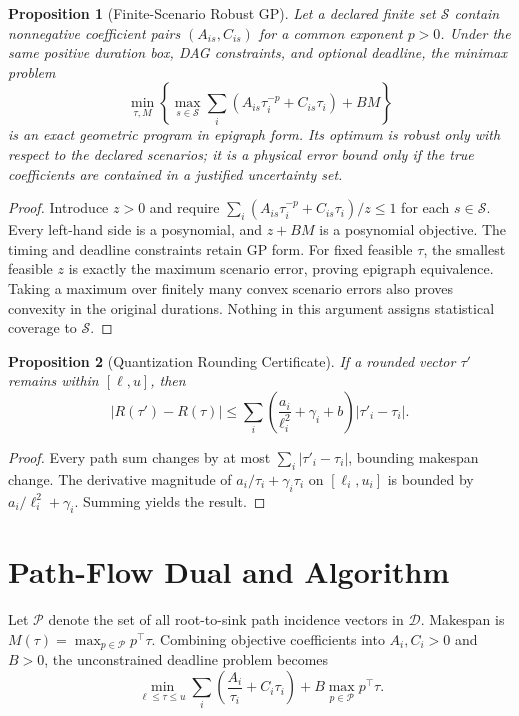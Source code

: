 \documentclass[10pt,letterpaper,journal]{IEEEtran}
\newtheorem{proposition}{Proposition}
\begin{document}
\begin{proposition}[Finite-Scenario Robust GP]\label{prop:scenario}
Let a declared finite set $\mathcal S$ contain nonnegative coefficient pairs $(A_{is},C_{is})$ for a common exponent $p>0$. Under the same positive duration box, DAG constraints, and optional deadline, the minimax problem
\begin{equation}
\min_{\tau,M}\left\{\max_{s\in\mathcal S}\sum_i(A_{is}\tau_i^{-p}+C_{is}\tau_i)+BM\right\}
\end{equation}
is an exact geometric program in epigraph form. Its optimum is robust only with respect to the \emph{declared} scenarios; it is a physical error bound only if the true coefficients are contained in a justified uncertainty set.
\end{proposition}
\begin{proof}
Introduce $z>0$ and require $\sum_i(A_{is}\tau_i^{-p}+C_{is}\tau_i)/z\le1$ for each $s\in\mathcal S$. Every left-hand side is a posynomial, and $z+BM$ is a posynomial objective. The timing and deadline constraints retain GP form. For fixed feasible $\tau$, the smallest feasible $z$ is exactly the maximum scenario error, proving epigraph equivalence. Taking a maximum over finitely many convex scenario errors also proves convexity in the original durations. Nothing in this argument assigns statistical coverage to $\mathcal S$.
\end{proof}

\begin{proposition}[Quantization Rounding Certificate]
If a rounded vector $\tau'$ remains within $[\ell, u]$, then
\begin{equation}
|R(\tau') - R(\tau)| \le \sum_i \left( \frac{a_i}{\ell_i^2} + \gamma_i + b \right) |\tau'_i - \tau_i|.
\end{equation}
\end{proposition}
\begin{proof}
Every path sum changes by at most $\sum_i |\tau'_i - \tau_i|$, bounding makespan change. The derivative magnitude of $a_i/\tau_i + \gamma_i\tau_i$ on $[\ell_i, u_i]$ is bounded by $a_i/\ell_i^2 + \gamma_i$. Summing yields the result.
\end{proof}

\section{Path-Flow Dual and Algorithm}
Let $\mathcal{P}$ denote the set of all root-to-sink path incidence vectors in $\mathcal{D}$. Makespan is $M(\tau) = \max_{p \in \mathcal{P}} p^\top \tau$. Combining objective coefficients into $A_i, C_i > 0$ and $B > 0$, the unconstrained deadline problem becomes
\begin{equation}
\min_{\ell \le \tau \le u} \sum_i \left( \frac{A_i}{\tau_i} + C_i \tau_i \right) + B \max_{p \in \mathcal{P}} p^\top \tau.
\end{equation}
\end{document}
